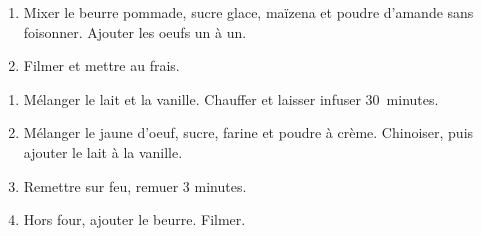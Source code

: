 \begin{recipe}
  \begin{enumerate}
  \item Mixer le beurre pommade, sucre glace, maïzena et poudre
    d'amande sans foisonner.  Ajouter les oeufs un à un.

  \item Filmer et mettre au frais.
  \end{enumerate}
\end{recipe}

\begin{ingredients}
\end{ingredients}

\begin{recipe}
  \begin{enumerate}
  \item Mélanger le lait et la vanille.  Chauffer et laisser infuser
    30~minutes.

  \item Mélanger le jaune d'oeuf, sucre, farine et poudre à crème.  Chinoiser, puis
    ajouter le lait à la vanille.

  \item Remettre sur feu, remuer 3 minutes.

  \item Hors four, ajouter le beurre.  Filmer.
  \end{enumerate}
\end{recipe}

\begin{ingredients}
\end{ingredients}

\begin{ingredients}
\end{ingredients}

